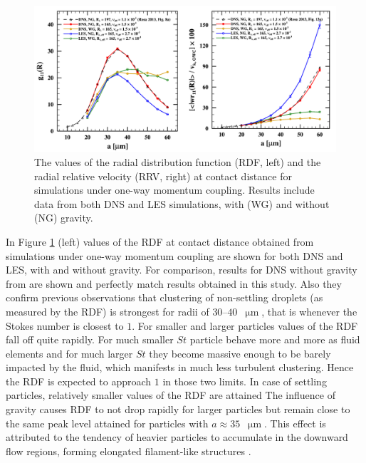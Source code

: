 \documentclass{pracamgren}
\begin{document}
\begin{figure}[h]
\centering
\includegraphics[width=13.5cm]{figures/2-06_owcrdfrrv.pdf}
\caption{
The values of the radial distribution function (RDF, left) and the radial relative velocity (RRV, right) at contact distance for simulations under one-way momentum coupling.
Results include data from both DNS and LES simulations, with (WG) and without (NG) gravity.
}
\label{fig:owcrdfrrv}
\end{figure}

In Figure \ref{fig:owcrdfrrv} (left) values of the RDF at contact distance obtained from simulations under one-way momentum coupling are shown for both DNS and LES, with and without gravity.
For comparison, results for DNS without gravity from \textcite{Rosa2013} are shown and perfectly match results obtained in this study.
Also they confirm previous observations that clustering of non-settling droplets (as measured by the RDF) is strongest for radii of $30$--$40$~$\upmu\text{m}$, that is whenever the Stokes number is closest to $1$.
For smaller and larger particles values of the RDF fall off quite rapidly.
For much smaller $St$ particle behave more and more as fluid elements and for much larger $St$ they become massive enough to be barely impacted by the fluid, which manifests in much less turbulent clustering.
Hence the RDF is expected to approach $1$ in those two limits.
In case of settling particles, relatively smaller values of the RDF are attained
The influence of gravity causes RDF to not drop rapidly for larger particles but remain close to the same peak level attained for particles with $a \approx 35$~$\upmu\text{m}$. 
This effect is attributed to the tendency of heavier particles to accumulate in the downward flow regions, forming elongated filament-like structures \parencite{Rosa2015}. 
\end{document}
